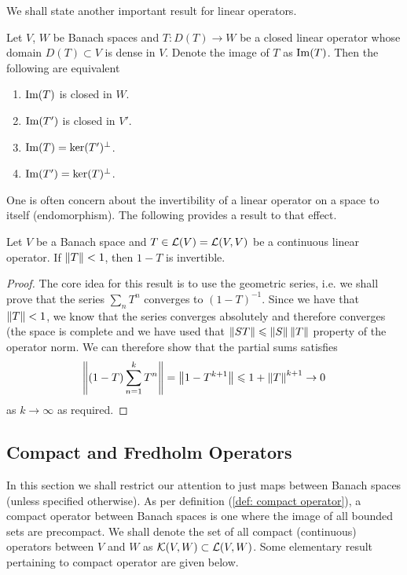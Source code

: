 \documentclass[12pt]{article}
\begin{document}
We shall state another important result for linear operators. 
\begin{ftheorem} Let $V$, $W$ be Banach spaces and $T: D(T) \to W$ be a closed linear operator whose domain $D(T) \subset V$ is dense in $V$.  Denote the image of $T$ as $\im(T)$. Then the following are equivalent
\begin{enumerate}
\item $\im(T)$ is closed in $W$. 
\item $\im(T')$ is closed in $V'$. 
\item $\im(T) = \ker(T')^\perp$.
\item $\im(T') = \ker(T)^\perp$. 
\end{enumerate}
\end{ftheorem}


One is often concern about the invertibility of a linear operator on a space to itself (endomorphism). The following provides a result to that effect. 
\begin{flemma} Let $V$ be a Banach space and $T \in \L(V) = \L(V, V)$ be a continuous linear operator. If $\norm[T] < 1$, then $1 - T$ is invertible.  

\begin{proof} The core idea for this result is to use the geometric series, i.e. we shall prove that the series $\sum_n T^n$ converges to $(1 - T)^{-1}$. Since we have that $\norm[T] < 1$, we know that the series converges absolutely and therefore converges (the space is complete and we have used that $\norm[ST] \leq \norm[S]\norm[T]$ property of the operator norm. We can therefore show that the partial sums satisfies
\begin{align*}
\norm[(1 - T) \sum_{n = 1}^k T^n] = \norm[1 - T^{k + 1} ] \leq 1 + \norm[T]^{k + 1} \to 0
\end{align*}
as $k \to \infty$ as required. 
\end{proof}

\end{flemma}


\subsection{Compact and Fredholm Operators}
In this section we shall restrict our attention to just maps between Banach spaces (unless specified otherwise). As per definition (\ref{def: compact operator}), a compact operator between Banach spaces is one where the image of all bounded sets are precompact. We shall denote the set of all compact (continuous) operators between $V$ and $W$ as $\K(V, W) \subset \L(V, W)$. Some elementary result pertaining to compact operator are given below. 
\end{document}
